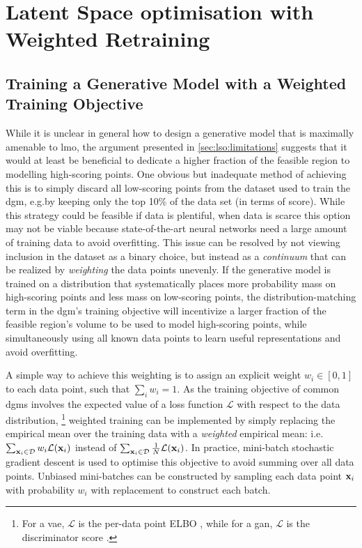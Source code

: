 \section{Latent Space optimisation with Weighted Retraining}
\label{sec:lso:main}
\subsection{Training a Generative Model with a Weighted Training Objective}
\label{subsec:weighting}
While it is unclear in general how to design a generative model that is maximally amenable to \gls{lmo},
the argument presented in \cref{sec:lso:limitations} suggests that it would at least be beneficial to dedicate
a higher fraction of the feasible region to modelling high-scoring points.
One obvious but inadequate method of achieving this is to simply discard all low-scoring points from the dataset used to train the \gls{dgm}, e.g.\@ by keeping only the top 10\% of the data set (in terms of score).
While this strategy could be feasible if data is plentiful, when data is scarce this option may not be viable
because state-of-the-art neural networks need a large amount of training data to avoid overfitting.
This issue can be resolved by not viewing inclusion in the dataset as a binary choice,
but instead as a \emph{continuum} that can be realized by \emph{weighting} the data points unevenly.
If the generative model is trained on a distribution that systematically places more probability mass on high-scoring points
and less mass on low-scoring points,
the distribution-matching term in the \gls{dgm}'s training objective will incentivize a larger fraction of the feasible
region's volume to be used to model high-scoring points,
while simultaneously using all known data points to learn useful representations and avoid overfitting.

A simple way to achieve this weighting is to assign an explicit weight $w_i\in[0,1]$ to each data point, such that $\sum_i w_i=1$.
As the training objective of common \glspl{dgm} involves the expected value of a loss
function $\mathcal{L}$ with respect to the data distribution,%
\footnote{For a \gls{vae}, $\mathcal{L}$ is the per-data point ELBO \citep{kingma2013auto}, while for a \gls{gan}, $\mathcal{L}$ is the discriminator score \citep{goodfellow2014generative}.}
weighted training can be implemented by simply replacing the empirical mean over the training data with a \emph{weighted} empirical mean:
i.e.\@ $\sum_{\mathbf{x}_i \in \mathcal{D}} w_i\mathcal{L}(\mathbf{x}_i)$ instead of $\sum_{\mathbf{x}_i \in \mathcal{D}} \frac{1}{N} \mathcal{L}(\mathbf{x}_i)$.
In practice, mini-batch stochastic gradient descent is used to optimise this objective
to avoid summing over all data points.
Unbiased mini-batches can be constructed by sampling each data point $\mathbf{x}_i$ with probability $w_i$
with replacement to construct each batch.

